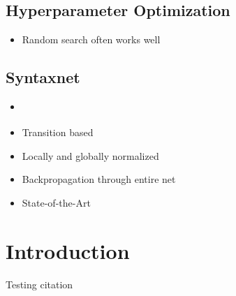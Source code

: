 \documentclass[12pt,a4paper,english
]{tutthesis}
\begin{document}
\section{Hyperparameter Optimization}
\begin{itemize}
\item Random search often works well
\end{itemize}

\section{Syntaxnet}
\begin{itemize}
\item \cite{Andor2016}
\item Transition based
\item Locally and globally normalized
\item Backpropagation through entire net
\item State-of-the-Art
\end{itemize}



\newpage

\if@twoside
\cleardoublepage
\fi

\setcounter{page}{1} %
\renewcommand{\chaptername}{} %


\chapter{Introduction}
\label{ch:intro}
Testing citation \cite{Andor2016}
\end{document}
